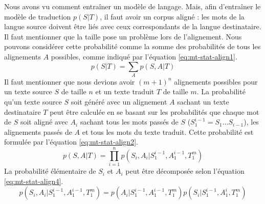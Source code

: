 \documentclass{KodeBook}
\begin{document}
Nous avons vu comment entraîner un modèle de langage. 
Mais, afin d'entraîner le modèle de traduction $p(S|T)$, il faut avoir un corpus aligné : les mots de la langue source doivent être liés avec ceux correspondants de la langue destinataire.
Il faut mentionner que la taille pose un problème lors de l'alignement. 
Nous pouvons considérer cette probabilité comme la somme des probabilités de tous les alignements $A$ possibles, comme indiqué par l'équation \ref{eq:mt-stat-align1}.
\begin{equation}\label{eq:mt-stat-align1}
p(S|T) = \sum_{A} p(S, A | T)
\end{equation}
Il faut mentionner que nous devions avoir $(m + 1)^n$ alignements possibles pour un texte source $S$ de taille $n$ et un texte traduit $T$ de taille $m$.
La probabilité qu'un texte source $S$ soit généré avec un alignement $A$ sachant un texte destinataire $T$ peut être calculée en se basant sur les probabilités que chaque mot de $S$ soit aligné avec $A_i$ sachant tous les mots passés de $S$ ($S_1^{i-1} = S_1 \ldots S_{i-1}$), les alignements passés de $A$ et tous les mots du texte traduit. 
Cette probabilité est formulée par l'équation \ref{eq:mt-stat-align2}.
\begin{equation}\label{eq:mt-stat-align2}
p(S, A | T) = \prod_{i=1}^{n} p(S_i, A_i | S_1^{i-1}, A_1^{i-1}, T_1^{m})
\end{equation}
La probabilité élémentaire de $S_i$ et $A_i$ peut être décomposée selon l'équation \ref{eq:mt-stat-align4}.
\begin{equation}\label{eq:mt-stat-align4}
p(S_i, A_i | S_1^{i-1}, A_1^{i-1}, T_1^{m}) = p(A_i | S_1^{i-1}, A_1^{i-1}, T_1^{m}) p(S_i | S_1^{i-1}, A_1^{i}, T_1^{m})
\end{equation}
\end{document}
